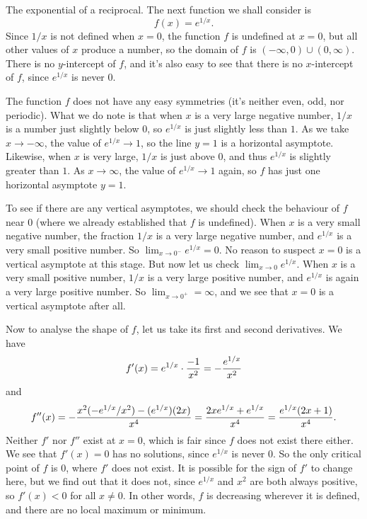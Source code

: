 \bye

\medskip\boldlabel{} The exponential of a reciprocal.
The next function we shall consider is
$$f(x) = e^{1/x}.$$
Since $1/x$ is not defined when $x=0$, the function $f$ is undefined at $x=0$, but all other
values of $x$ produce a number, so the domain of $f$ is $(-\infty, 0)\cup (0,\infty)$.
There is no $y$-intercept of $f$, and it's also easy to see that there is no $x$-intercept of
$f$, since $e^{1/x}$ is never $0$.

The function $f$ does not have any easy symmetries (it's neither even, odd, nor periodic). What we
do note is that when $x$ is a very large negative number, $1/x$ is a number just slightly below $0$, so
$e^{1/x}$ is just slightly less than $1$. As we take $x\to -\infty$, the value of $e^{1/x} \to 1$,
so the line $y=1$ is a horizontal asymptote. Likewise, when $x$ is very large, $1/x$ is just above $0$,
and thus $e^{1/x}$ is slightly greater than $1$. As $x\to \infty$, the value of $e^{1/x}\to 1$ again, so
$f$ has just one horizontal asymptote $y=1$.

To see if there are any vertical asymptotes, we should check the behaviour of $f$ near $0$ (where we
already established that $f$ is undefined). When $x$ is a very small negative number,
the fraction $1/x$ is a very large negative
number, and $e^{1/x}$ is a very small positive number. So $\lim_{x\to 0^-} e^{1/x} = 0$. No reason to suspect
$x=0$ is a vertical asymptote at this stage. But now let us check $\lim_{x\to 0} e^{1/x}$. When
$x$ is a very small positive number, $1/x$ is a very large positive number, and $e^{1/x}$ is again a very large
positive number. So $\lim_{x\to 0^+} = \infty$, and we see that $x=0$ is a vertical asymptote after all.

Now to analyse the shape of $f$, let us take its first and second derivatives. We have
$$f'(x) = e^{1/x} \cdot {-1\over x^2} = -{e^{1/x}\over x^2}$$
and
$$f''(x) = -{x^2 (-e^{1/x}/x^2) - (e^{1/x}) (2x)\over x^4}
= {2xe^{1/x} + e^{1/x} \over x^4} = {e^{1/x}(2x+1)\over x^4}.$$
Neither $f'$ nor $f''$ exist at $x=0$, which is fair since $f$ does not exist there either.
We see that $f'(x) = 0$ has no solutions, since $e^{1/x}$ is never $0$. So the only critical point of
$f$ is $0$, where $f'$ does not exist. It is possible for the sign of $f'$ to change here, but we find
out that it does not, since $e^{1/x}$ and $x^2$ are both always positive, so $f'(x) < 0$ for all $x\ne 0$.
In other words, $f$ is decreasing wherever it is defined, and there are no local maximum or minimum.


